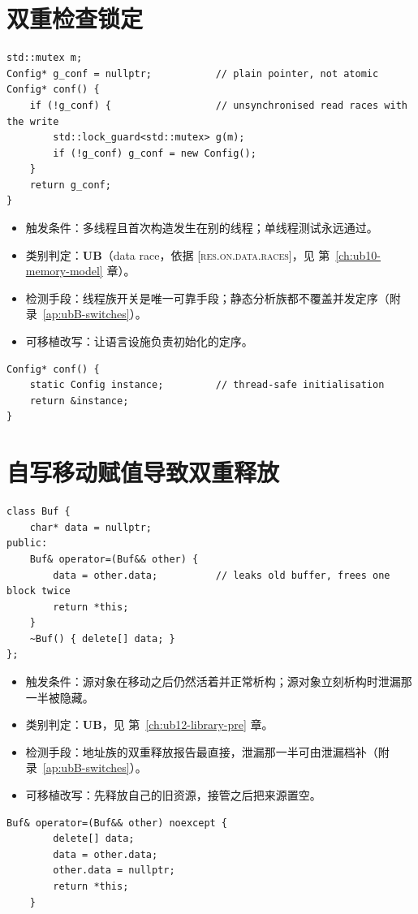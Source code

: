 \documentclass[12pt,a4paper,fontset=fandol]{ctexbook}
\newcommand{\Bk}{\discretionary{}{}{}}
\newcommand{\UB}{\textbf{\textsf{UB}}}
\newcommand{\Std}[1]{\textsc{[#1]}}
\begin{document}
\section{双重检查锁定}
\begin{lstlisting}[style=cppstyle, caption={反例：快路径上的读取没有同步}]
std::mutex m;
Config* g_conf = nullptr;           // plain pointer, not atomic
Config* conf() {
    if (!g_conf) {                  // unsynchronised read races with the write
        std::lock_guard<std::mutex> g(m);
        if (!g_conf) g_conf = new Config();
    }
    return g_conf;
}
\end{lstlisting}
\begin{itemize}
\item 触发条件：多线程且首次构造发生在别的线程；单线程测试永远通过。
\item 类别判定：\UB{}（data race，依据 \Std{res.on{\Bk}.data{\Bk}.races}，见 第~\ref{ch:ub10-memory-model} 章）。
\item 检测手段：线程族开关是唯一可靠手段；静态分析族都不覆盖并发定序（附录~\ref{ap:ubB-switches}）。
\item 可移植改写：让语言设施负责初始化的定序。
\end{itemize}
\begin{lstlisting}[style=cppstyle, caption={改写：函数内静态对象}]
Config* conf() {
    static Config instance;         // thread-safe initialisation
    return &instance;
}
\end{lstlisting}

\section{自写移动赋值导致双重释放}
\begin{lstlisting}[style=cppstyle, caption={反例：接走指针却没清空来源}]
class Buf {
    char* data = nullptr;
public:
    Buf& operator=(Buf&& other) {
        data = other.data;          // leaks old buffer, frees one block twice
        return *this;
    }
    ~Buf() { delete[] data; }
};
\end{lstlisting}
\begin{itemize}
\item 触发条件：源对象在移动之后仍然活着并正常析构；源对象立刻析构时泄漏那一半被隐藏。
\item 类别判定：\UB{}，见 第~\ref{ch:ub12-library-pre} 章。
\item 检测手段：地址族的双重释放报告最直接，泄漏那一半可由泄漏档补（附录~\ref{ap:ubB-switches}）。
\item 可移植改写：先释放自己的旧资源，接管之后把来源置空。
\end{itemize}
\begin{lstlisting}[style=cppstyle, caption={改写：接管与置空成对出现}]
    Buf& operator=(Buf&& other) noexcept {
        delete[] data;
        data = other.data;
        other.data = nullptr;
        return *this;
    }
\end{lstlisting}
\end{document}
